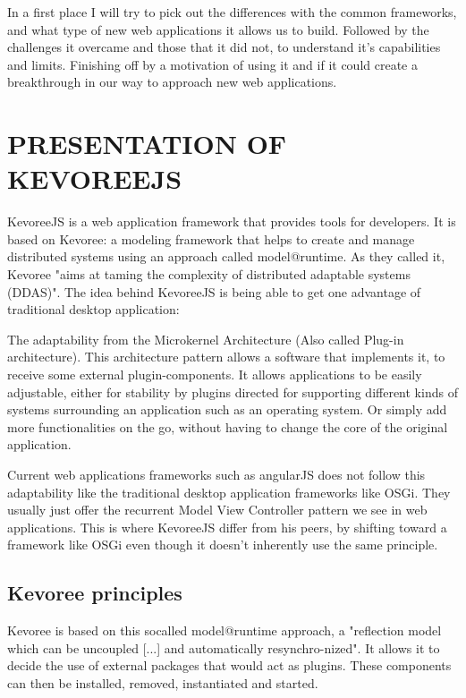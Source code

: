 \documentclass{aes2e}
\begin{document}
In a first place I will try to pick out the differences with the common frameworks, and what type of new web applications it allows us to build. Followed by the challenges it overcame and those that it did not, to understand it's capabilities and limits. Finishing off by a motivation of using it and if it could create a breakthrough in our way to approach new web applications. 


\section{PRESENTATION OF KEVOREEJS}

KevoreeJS is a web application framework that provides tools for developers. It is based on Kevoree: a modeling framework that helps to create and manage distributed systems using an approach called model@runtime.\cite{DEK3}\cite{DEK4} As they called it, Kevoree "aims at taming the complexity of distributed adaptable systems (DDAS)"\cite{DEK4}. The idea behind KevoreeJS is being able to get one advantage of traditional desktop application: 

The adaptability from the Microkernel Architecture (Also called Plug-in architecture). This architecture pattern allows a software that implements it, to receive some external plugin-components\cite{DEK2}. It allows applications to be easily adjustable, either for stability by plugins directed for supporting different kinds of systems surrounding an application such as an operating system. Or simply add more functionalities on the go, without having to change the core of the original application\cite{DEK2}.
\linebreak
 
Current web applications frameworks such as angularJS does not follow this adaptability like the traditional desktop application frameworks like OSGi. They usually just offer the recurrent Model View Controller pattern we see in web applications. This is where KevoreeJS differ from his peers, by shifting toward a framework like OSGi even though it doesn't inherently use the same principle.

\subsection{Kevoree principles}
Kevoree is based on this socalled model@runtime approach, a "reflection model which can be uncoupled [...] and automatically resynchro-nized"\cite{DEK1}. It allows it to decide the use of external packages that would act as plugins. These components can then be installed, removed, instantiated and started.
\linebreak
 
\end{document}

